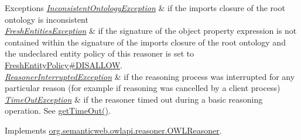 \begin{DoxyExceptions}{Exceptions}
{\em \hyperlink{classorg_1_1semanticweb_1_1owlapi_1_1reasoner_1_1_inconsistent_ontology_exception}{Inconsistent\-Ontology\-Exception}} & if the imports closure of the root ontology is inconsistent \\
\hline
{\em \hyperlink{classorg_1_1semanticweb_1_1owlapi_1_1reasoner_1_1_fresh_entities_exception}{Fresh\-Entities\-Exception}} & if the signature of the object property expression is not contained within the signature of the imports closure of the root ontology and the undeclared entity policy of this reasoner is set to \hyperlink{enumorg_1_1semanticweb_1_1owlapi_1_1reasoner_1_1_fresh_entity_policy_a762eae6d5b2449d125311ecaabfdc8d0}{Fresh\-Entity\-Policy\#\-D\-I\-S\-A\-L\-L\-O\-W}. \\
\hline
{\em \hyperlink{classorg_1_1semanticweb_1_1owlapi_1_1reasoner_1_1_reasoner_interrupted_exception}{Reasoner\-Interrupted\-Exception}} & if the reasoning process was interrupted for any particular reason (for example if reasoning was cancelled by a client process) \\
\hline
{\em \hyperlink{classorg_1_1semanticweb_1_1owlapi_1_1reasoner_1_1_time_out_exception}{Time\-Out\-Exception}} & if the reasoner timed out during a basic reasoning operation. See \hyperlink{classorg_1_1semanticweb_1_1owlapi_1_1reasoner_1_1impl_1_1_o_w_l_reasoner_base_af55342eaaabb1b72dacfde7a181b93d2}{get\-Time\-Out()}. \\
\hline
\end{DoxyExceptions}


Implements \hyperlink{interfaceorg_1_1semanticweb_1_1owlapi_1_1reasoner_1_1_o_w_l_reasoner_a1960bc6267550e739a65f8dc65c93994}{org.\-semanticweb.\-owlapi.\-reasoner.\-O\-W\-L\-Reasoner}.

